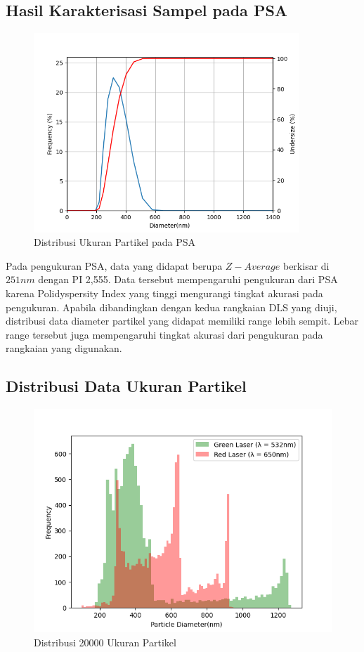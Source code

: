 \subsection{Hasil Karakterisasi Sampel pada PSA}
\begin{figure}[H]
  \centering
  \includegraphics[width=10cm]{Images/DistribusiPSA.png}
  \caption{Distribusi Ukuran Partikel pada PSA}
  \label{fig:psa}
\end{figure}
Pada pengukuran PSA, data yang didapat berupa ${Z-Average}$ berkisar
di ${251 nm}$ dengan PI 2,555. Data tersebut mempengaruhi pengukuran
dari PSA karena Polidyspersity Index yang tinggi mengurangi tingkat
akurasi pada pengukuran. Apabila dibandingkan dengan kedua rangkaian
DLS yang diuji, distribusi data diameter partikel yang didapat
memiliki range lebih sempit. Lebar range tersebut juga mempengaruhi
tingkat akurasi dari pengukuran pada rangkaian yang digunakan.


\subsection{Distribusi Data Ukuran Partikel}
\begin{figure}[H]
  \centering
  \includegraphics[width=13cm]{Images/Distribusi 10000x.png}
  \caption{Distribusi 20000 Ukuran Partikel}
  \label{fig:dist10000x}
\end{figure}

